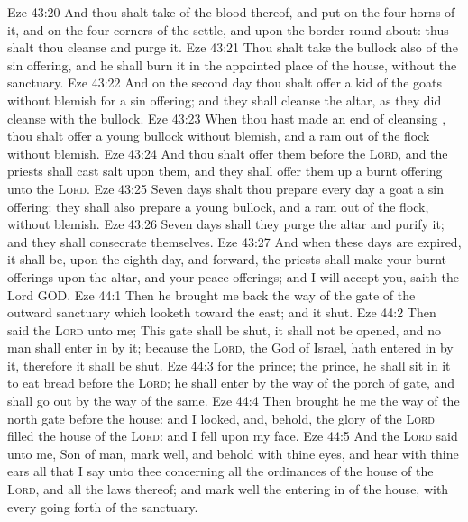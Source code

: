 \vs Eze 43:20 And thou shalt take of the blood thereof, and put  on the four horns of it, and on the four corners of the settle, and upon the border round about: thus shalt thou cleanse and purge it.
\vs Eze 43:21 Thou shalt take the bullock also of the sin offering, and he shall burn it in the appointed place of the house, without the sanctuary.
\vs Eze 43:22 And on the second day thou shalt offer a kid of the goats without blemish for a sin offering; and they shall cleanse the altar, as they did cleanse  with the bullock.
\vs Eze 43:23 When thou hast made an end of cleansing , thou shalt offer a young bullock without blemish, and a ram out of the flock without blemish.
\vs Eze 43:24 And thou shalt offer them before the \textsc{Lord}, and the priests shall cast salt upon them, and they shall offer them up  a burnt offering unto the \textsc{Lord}.
\vs Eze 43:25 Seven days shalt thou prepare every day a goat  a sin offering: they shall also prepare a young bullock, and a ram out of the flock, without blemish.
\vs Eze 43:26 Seven days shall they purge the altar and purify it; and they shall consecrate themselves.
\vs Eze 43:27 And when these days are expired, it shall be,  upon the eighth day, and  forward, the priests shall make your burnt offerings upon the altar, and your peace offerings; and I will accept you, saith the Lord GOD.
\vs Eze 44:1 Then he brought me back the way of the gate of the outward sanctuary which looketh toward the east; and it  shut.
\vs Eze 44:2 Then said the \textsc{Lord} unto me; This gate shall be shut, it shall not be opened, and no man shall enter in by it; because the \textsc{Lord}, the God of Israel, hath entered in by it, therefore it shall be shut.
\vs Eze 44:3  for the prince; the prince, he shall sit in it to eat bread before the \textsc{Lord}; he shall enter by the way of the porch of  gate, and shall go out by the way of the same.
\vs Eze 44:4 Then brought he me the way of the north gate before the house: and I looked, and, behold, the glory of the \textsc{Lord} filled the house of the \textsc{Lord}: and I fell upon my face.
\vs Eze 44:5 And the \textsc{Lord} said unto me, Son of man, mark well, and behold with thine eyes, and hear with thine ears all that I say unto thee concerning all the ordinances of the house of the \textsc{Lord}, and all the laws thereof; and mark well the entering in of the house, with every going forth of the sanctuary.
